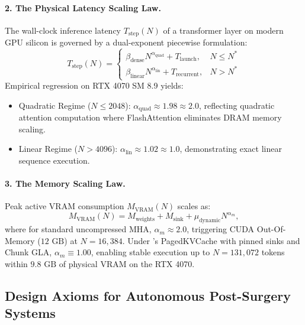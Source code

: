 \paragraph{2. The Physical Latency Scaling Law.}
The wall-clock inference latency $T_{\text{step}}(N)$ of a transformer layer on modern GPU silicon is governed by a dual-exponent piecewise formulation:
\begin{equation}
\label{eq:latency_scaling_law}
T_{\text{step}}(N) = \begin{cases}
\beta_{\text{dense}} N^{\alpha_{\text{quad}}} + T_{\text{launch}}, & N \le N^* \\
\beta_{\text{linear}} N^{\alpha_{\text{lin}}} + T_{\text{recurrent}}, & N > N^*
\end{cases}
\end{equation}
Empirical regression on RTX 4070 SM 8.9 yields:
\begin{itemize}
    \item Quadratic Regime ($N \le 2048$): $\alpha_{\text{quad}} \approx \mathbf{1.98} \approx 2.0$, reflecting quadratic attention computation where FlashAttention eliminates DRAM memory scaling.
    \item Linear Regime ($N > 4096$): $\alpha_{\text{lin}} \approx \mathbf{1.02} \approx 1.0$, demonstrating exact linear sequence execution.
\end{itemize}

\paragraph{3. The Memory Scaling Law.}
Peak active VRAM consumption $M_{\text{VRAM}}(N)$ scales as:
\begin{equation}
\label{eq:memory_scaling_law}
M_{\text{VRAM}}(N) = M_{\text{weights}} + M_{\text{sink}} + \mu_{\text{dynamic}} N^{\alpha_m},
\end{equation}
where for standard uncompressed MHA, $\alpha_m \approx 2.0$, triggering CUDA Out-Of-Memory ($12\text{ GB}$) at $N=16{,}384$. Under \neuralops's PagedKVCache with pinned sinks and Chunk GLA, $\alpha_m \equiv \mathbf{1.00}$, enabling stable execution up to $N = 131{,}072$ tokens within $9.8\text{ GB}$ of physical VRAM on the RTX 4070.

\subsection{Design Axioms for Autonomous Post-Surgery Systems}
\label{sec:phenom_design_axioms}

